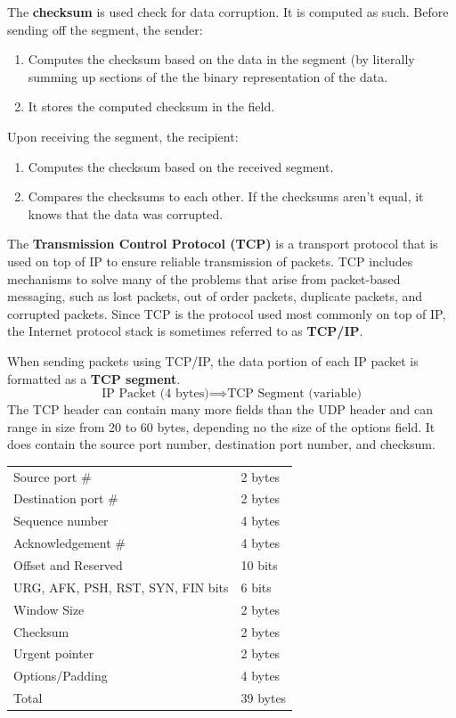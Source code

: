\documentclass{article}
\begin{document}
  The \textbf{checksum} is used check for data corruption. It is computed as such. Before sending off the segment, the sender: 
  \begin{enumerate}
      \item Computes the checksum based on the data in the segment (by literally summing up sections of the the binary representation of the data. 
      \item It stores the computed checksum in the field. 
  \end{enumerate}
  Upon receiving the segment, the recipient: 
  \begin{enumerate}
      \item Computes the checksum based on the received segment. 
      \item Compares the checksums to each other. If the checksums aren't equal, it knows that the data was corrupted. 
  \end{enumerate}

  The \textbf{Transmission Control Protocol (TCP)} is a transport protocol that is used on top of IP to ensure reliable transmission of packets. TCP includes mechanisms to solve many of the problems that arise from packet-based messaging, such as lost packets, out of order packets, duplicate packets, and corrupted packets. Since TCP is the protocol used most commonly on top of IP, the Internet protocol stack is sometimes referred to as \textbf{TCP/IP}.  

  When sending packets using TCP/IP, the data portion of each IP packet is formatted as a \textbf{TCP segment}. 
  \[\text{IP Packet (4 bytes)} \implies \text{TCP Segment (variable)}\]
  The TCP header can contain many more fields than the UDP header and can range in size from 20 to 60 bytes, depending no the size of the options field. It does contain the source port number, destination port number, and checksum. 
  \begin{center}
  \begin{tabular}{l|l}
      Source port \# & 2 bytes \\
      Destination port \# & 2 bytes \\
      Sequence number & 4 bytes \\
      Acknowledgement \# & 4 bytes \\
      Offset and Reserved & 10 bits \\
      URG, AFK, PSH, RST, SYN, FIN bits & 6 bits \\
      Window Size & 2 bytes \\
      Checksum & 2 bytes \\
      Urgent pointer & 2 bytes \\
      Options/Padding & 4 bytes \\
      \hline 
      Total & 39 bytes
  \end{tabular}
  \end{center}
\end{document}
